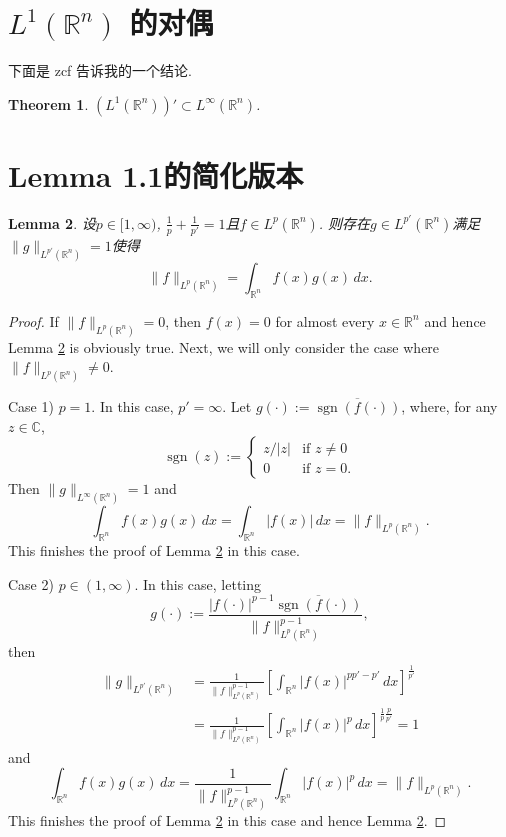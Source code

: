 \documentclass[a4paper,11pt]{article}
\newtheorem{theorem}{Theorem}[section]
\newtheorem{lemma}[theorem]{Lemma}
\theoremstyle{definition}
\begin{document}
\section{$ L^1(\mathbb{R}^n)$ 的对偶}

下面是 zcf 告诉我的一个结论.

\begin{theorem}
$ (L^1(\mathbb{R}^n))' \subset L^\infty(\mathbb{R}^n) $.
\end{theorem}

\newpage

\section{Lemma 1.1的简化版本}

\begin{lemma}\label{spe}
设$ p \in [1, \infty) $, $\frac1p+\frac1{p'}=1$且$ f\in L^p(\mathbb{R}^n)$.
则存在$g\in L^{p'}(\mathbb{R}^n)$满足$\|g\|_{L^{p'}(\mathbb{R}^n)}=1$使得
$$
\| f \|_{L^p(\mathbb{R}^n)}
= \int_{\mathbb{R}^n} f(x) g(x) \, dx.
$$
\end{lemma}

\begin{proof}
If $\|f\|_{L^p(\mathbb{R}^n)}=0$, then
$f(x)=0$ for almost every $x\in\mathbb R^n$
and hence Lemma \ref{spe} is obviously true.
Next, we will only consider the case where $\|f\|_{L^p(\mathbb{R}^n)}\neq0$.

Case 1) $p=1$. In this case, $p'=\infty$.
Let $g(\cdot):=\overline{\operatorname{sgn}(f(\cdot))}$,
where, for any $z\in\mathbb C$,
$$
\operatorname{sgn}(z)
:=\begin{cases}
z/|z|&\text{if } z\neq0\\
0&\text{if } z=0.
\end{cases}
$$
Then $\|g\|_{L^\infty(\mathbb{R}^n)}=1$ and
$$
\int_{\mathbb{R}^n} f(x) g(x) \, dx
=\int_{\mathbb{R}^n} |f(x)| \, dx
=\| f \|_{L^p(\mathbb{R}^n)}.
$$
This finishes the proof of Lemma \ref{spe} in this case.

Case 2) $p\in(1,\infty)$. In this case, letting
$$
g(\cdot):=\frac{|f(\cdot)|^{p-1}\overline{\operatorname{sgn}(f(\cdot))}}
{\|f\|_{L^p(\mathbb{R}^n)}^{p-1}},
$$
then
\begin{align*}
\|g\|_{L^{p'}(\mathbb{R}^n)}
&=\frac1{\|f\|_{L^p(\mathbb{R}^n)}^{p-1}}
\left[\int_{\mathbb R^n}|f(x)|^{pp'-p'}\,dx\right]^{\frac1{p'}}\\
&=\frac1{\|f\|_{L^p(\mathbb{R}^n)}^{p-1}}
\left[\int_{\mathbb R^n}|f(x)|^p\,dx\right]^{\frac{1}{p}\frac{p}{p'}}
=1
\end{align*}
and
$$
\int_{\mathbb{R}^n} f(x) g(x) \, dx
=\frac1{\|f\|_{L^p(\mathbb{R}^n)}^{p-1}}
\int_{\mathbb{R}^n} |f(x)|^p \, dx
=\| f \|_{L^p(\mathbb{R}^n)}.
$$
This finishes the proof of Lemma \ref{spe} in this case and hence Lemma \ref{spe}.
\end{proof}
\end{document}
